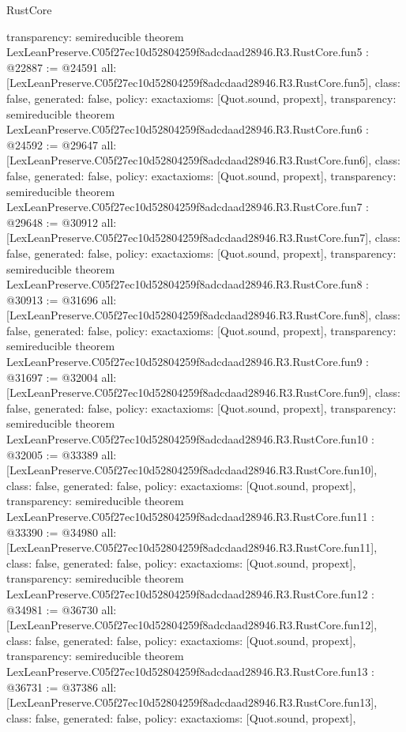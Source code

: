 \begin{lexlean}{RustCore}
\begin{coremodule}
{  transparency: semireducible
}
theorem LexLeanPreserve.C05f27ec10d52804259f8adcdaad28946.R3.RustCore.fun5 : @22887 := @24591 {
  all: [LexLeanPreserve.C05f27ec10d52804259f8adcdaad28946.R3.RustCore.fun5],
  class: false,
  generated: false,
  policy: exact{axioms: [Quot.sound, propext]},
  transparency: semireducible
}
theorem LexLeanPreserve.C05f27ec10d52804259f8adcdaad28946.R3.RustCore.fun6 : @24592 := @29647 {
  all: [LexLeanPreserve.C05f27ec10d52804259f8adcdaad28946.R3.RustCore.fun6],
  class: false,
  generated: false,
  policy: exact{axioms: [Quot.sound, propext]},
  transparency: semireducible
}
theorem LexLeanPreserve.C05f27ec10d52804259f8adcdaad28946.R3.RustCore.fun7 : @29648 := @30912 {
  all: [LexLeanPreserve.C05f27ec10d52804259f8adcdaad28946.R3.RustCore.fun7],
  class: false,
  generated: false,
  policy: exact{axioms: [Quot.sound, propext]},
  transparency: semireducible
}
theorem LexLeanPreserve.C05f27ec10d52804259f8adcdaad28946.R3.RustCore.fun8 : @30913 := @31696 {
  all: [LexLeanPreserve.C05f27ec10d52804259f8adcdaad28946.R3.RustCore.fun8],
  class: false,
  generated: false,
  policy: exact{axioms: [Quot.sound, propext]},
  transparency: semireducible
}
theorem LexLeanPreserve.C05f27ec10d52804259f8adcdaad28946.R3.RustCore.fun9 : @31697 := @32004 {
  all: [LexLeanPreserve.C05f27ec10d52804259f8adcdaad28946.R3.RustCore.fun9],
  class: false,
  generated: false,
  policy: exact{axioms: [Quot.sound, propext]},
  transparency: semireducible
}
theorem LexLeanPreserve.C05f27ec10d52804259f8adcdaad28946.R3.RustCore.fun10 : @32005 := @33389 {
  all: [LexLeanPreserve.C05f27ec10d52804259f8adcdaad28946.R3.RustCore.fun10],
  class: false,
  generated: false,
  policy: exact{axioms: [Quot.sound, propext]},
  transparency: semireducible
}
theorem LexLeanPreserve.C05f27ec10d52804259f8adcdaad28946.R3.RustCore.fun11 : @33390 := @34980 {
  all: [LexLeanPreserve.C05f27ec10d52804259f8adcdaad28946.R3.RustCore.fun11],
  class: false,
  generated: false,
  policy: exact{axioms: [Quot.sound, propext]},
  transparency: semireducible
}
theorem LexLeanPreserve.C05f27ec10d52804259f8adcdaad28946.R3.RustCore.fun12 : @34981 := @36730 {
  all: [LexLeanPreserve.C05f27ec10d52804259f8adcdaad28946.R3.RustCore.fun12],
  class: false,
  generated: false,
  policy: exact{axioms: [Quot.sound, propext]},
  transparency: semireducible
}
theorem LexLeanPreserve.C05f27ec10d52804259f8adcdaad28946.R3.RustCore.fun13 : @36731 := @37386 {
  all: [LexLeanPreserve.C05f27ec10d52804259f8adcdaad28946.R3.RustCore.fun13],
  class: false,
  generated: false,
  policy: exact{axioms: [Quot.sound, propext]},
}
\end{coremodule}
\end{lexlean}
